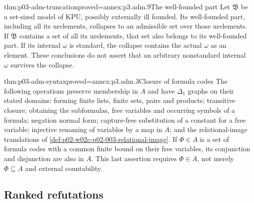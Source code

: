 \begin{hbtheorem}{thm:p03-adm-truncation}{proved=annex:p3.adm.9}{The well-founded part}
Let \(\mathfrak B\) be a set-sized model of \(\mathrm{KPU}\), possibly
externally ill founded. Its well-founded part, including all its
urelements, collapses to an admissible set over those urelements.
If \(\mathfrak B\) contains a set of all its urelements, that set also
belongs to its well-founded part. If its internal \(\omega\) is standard,
the collapse contains the actual \(\omega\) as an element.
These conclusions do not assert that an arbitrary nonstandard internal
\(\omega\) survives the collapse.
\end{hbtheorem}

\begin{hblemma}{thm:p03-adm-syntax}{proved=annex:p3.adm.3}{Closure of formula codes}
The following operations preserve membership in \(A\) and have
\(\Delta_1\) graphs on their stated domains: forming finite lists,
finite sets, pairs and products; transitive closure; obtaining the
subformulas, free variables and occurring symbols of a formula;
negation normal form; capture-free substitution of a constant for a free
variable; injective renaming of variables by a map in \(A\); and the relational-image
translations of \cref{def:p02-w02c-p02-003-relational-image}.
If \(\Phi\in A\) is a set of formula codes with a common finite bound
on their free variables, its conjunction and disjunction are also in
\(A\). This last assertion requires \(\Phi\in A\), not merely
\(\Phi\subseteq A\) and external countability.
\end{hblemma}

\subsection{Ranked refutations}

